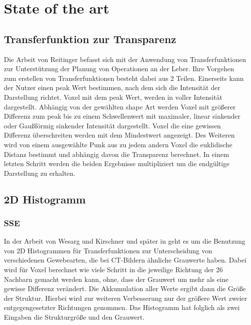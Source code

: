 \documentclass{article}
\begin{document}
\section{State of the art}
\subsection{Transferfunktion zur Transparenz}

Die Arbeit von Reitinger \cite{reitinger2004user} befasst sich mit der Anwendung von Transferfunktionen zur Unterstützung der Planung von Operationen an der Leber. Ihre Vorgehen zum erstellen von Transferfunktionen besteht dabei aus 2 Teilen.
\newline
Einerseits kann der Nutzer einen peak Wert bestimmen, nach dem sich die Intensität der Darstellung richtet. Voxel mit dem peak Wert, werden in voller Intensität dargestellt. Abhängig von der gewählten shape Art werden Voxel mit größerer Differenz zum peak  bis zu einem Schwellenwert mit maximaler, linear sinkender oder Gaußförmig sinkender Intensität dargestellt. Voxel die eine gewissen Differenz überschreiten werden mit dem Mindestwert angezeigt.
\newline
Des Weiteren wird von einem ausgewählte Punk aus zu jedem andern Voxel die euklidische Distanz bestimmt und abhängig davon die Transparenz berechnet.
\newline
In einem letzten Schritt werden die beiden Ergebnisse multipliziert um die endgültige Darstellung zu erhalten.


\subsection{2D Histogramm}

\subsubsection{SSE}

In der Arbeit von Wesarg und Kirschner \cite{wesarg2009structure} und später in \cite{wesarg20102d} geht es um die Benutzung von 2D Histogrammen für Transferfunktionen zur Unterscheidung von verschiedenen Gewebearten, die bei CT-Bildern ähnliche Grauwerte haben.
\newline
Dabei wird für Voxel berechnet wie viele Schritt in die jeweilige Richtung der 26 Nachbarn gemacht werden kann, ohne, dass der Grauwert um mehr als eine gewisse Differenz verändert. Die Akkumulation aller Werte ergibt dann die Größe der Struktur. Hierbei wird zur weiteren Verbesserung nur der größere Wert zweier entgegengesetzter Richtungen genommen.
\newline
Das Histogramm hat folglich als zwei Eingaben die Strukturgröße und den Grauwert.
\end{document}
